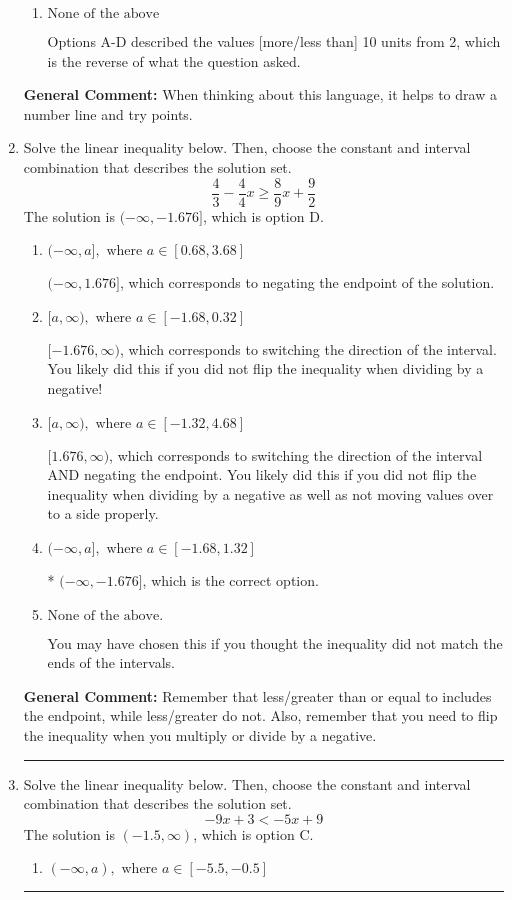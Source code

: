 \documentclass{extbook}[14pt]
\newcommand{\litem}[1]{\item #1

\rule{\textwidth}{0.4pt}}
\begin{document}
\begin{enumerate}
{\begin{enumerate}[label=\Alph*.]
This describes the values less than 10 from 2
\item \( \text{None of the above} \)

Options A-D described the values [more/less than] 10 units from 2, which is the reverse of what the question asked.
\end{enumerate}

\textbf{General Comment:} When thinking about this language, it helps to draw a number line and try points.
}
\litem{
Solve the linear inequality below. Then, choose the constant and interval combination that describes the solution set.
\[ \frac{4}{3} - \frac{4}{4} x \geq \frac{8}{9} x + \frac{9}{2} \]
The solution is \( (-\infty, -1.676] \), which is option D.\begin{enumerate}[label=\Alph*.]
\item \( (-\infty, a], \text{ where } a \in [0.68, 3.68] \)

 $(-\infty, 1.676]$, which corresponds to negating the endpoint of the solution.
\item \( [a, \infty), \text{ where } a \in [-1.68, 0.32] \)

 $[-1.676, \infty)$, which corresponds to switching the direction of the interval. You likely did this if you did not flip the inequality when dividing by a negative!
\item \( [a, \infty), \text{ where } a \in [-1.32, 4.68] \)

 $[1.676, \infty)$, which corresponds to switching the direction of the interval AND negating the endpoint. You likely did this if you did not flip the inequality when dividing by a negative as well as not moving values over to a side properly.
\item \( (-\infty, a], \text{ where } a \in [-1.68, 1.32] \)

* $(-\infty, -1.676]$, which is the correct option.
\item \( \text{None of the above}. \)

You may have chosen this if you thought the inequality did not match the ends of the intervals.
\end{enumerate}

\textbf{General Comment:} Remember that less/greater than or equal to includes the endpoint, while less/greater do not. Also, remember that you need to flip the inequality when you multiply or divide by a negative.
}
\litem{
Solve the linear inequality below. Then, choose the constant and interval combination that describes the solution set.
\[ -9x + 3 < -5x + 9 \]
The solution is \( (-1.5, \infty) \), which is option C.\begin{enumerate}[label=\Alph*.]
\item \( (-\infty, a), \text{ where } a \in [-5.5, -0.5] \)


\end{enumerate}}
\end{enumerate}
\end{document}
